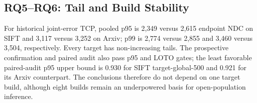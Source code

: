\subsection{RQ5--RQ6: Tail and Build Stability}
For historical joint-error TCP, pooled p95 is 2,349 versus 2,615 endpoint NDC on SIFT and 3,117 versus 3,252 on Arxiv; p99 is 2,774 versus 2,855 and 3,460 versus 3,504, respectively. Every target has non-increasing tails. The prospective confirmation and paired audit also pass p95 and LOTO gates; the least favorable paired-audit p95 upper bound is 0.930 for SIFT target-global-500 and 0.921 for its Arxiv counterpart. The conclusions therefore do not depend on one target build, although eight builds remain an underpowered basis for open-population inference.
